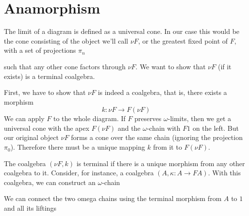 \documentclass[11pt]{amsart}
\begin{document}
\section{Anamorphism}

The limit of a diagram is defined as a universal cone. In our case this would be the cone consisting of the object we'll call $\nu F$, or the greatest fixed point of $F$, with a set of projections $\pi_n$

\begin{figure}[H]
\centering
{}
\end{figure}
such that any other cone factors through $\nu F$. We want to show that $\nu F$ (if it exists) is a terminal coalgebra. 

First, we have to show that $\nu F$ is indeed a coalgebra, that is, there exists a morphism 
\[k \colon \nu F \to F (\nu F)\]
We can apply $F$ to the whole diagram. If $F$ preserves $\omega$-limits, then we get a universal cone with the apex $F (\nu F)$ and the $\omega$-chain with $F 1$ on the left. But our original object $\nu F$ forms a cone over the same chain (ignoring the projection $\pi_0$). Therefore there must be a unique mapping $k$ from it to $F (\nu F)$.

The coalgebra $(\nu F, k)$ is terminal if there is a unique morphism from any other coalgebra to it. Consider, for instance, a coalgebra $(A, \kappa \colon A \to F A)$. With this coalgebra, we can construct an $\omega$-chain
\begin{figure}[H]
\centering
{}
\end{figure}

We can connect the two omega chains using the terminal morphism from $A$ to $1$ and all its liftings

\begin{figure}[H]
\centering
{}
\end{figure}
\end{document}
